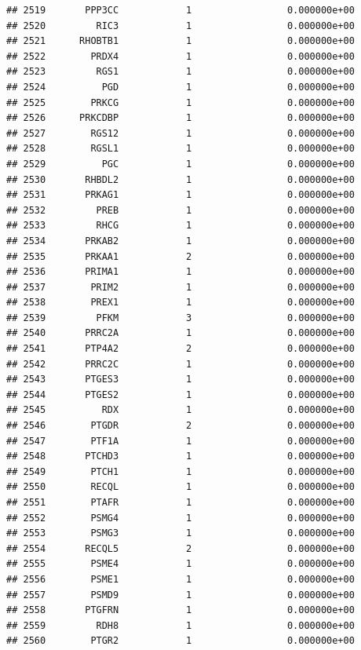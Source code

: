 \documentclass[
]{article}
\begin{document}
\begin{verbatim}
## 2519       PPP3CC            1                 0.000000e+00
## 2520         RIC3            1                 0.000000e+00
## 2521      RHOBTB1            1                 0.000000e+00
## 2522        PRDX4            1                 0.000000e+00
## 2523         RGS1            1                 0.000000e+00
## 2524          PGD            1                 0.000000e+00
## 2525        PRKCG            1                 0.000000e+00
## 2526      PRKCDBP            1                 0.000000e+00
## 2527        RGS12            1                 0.000000e+00
## 2528        RGSL1            1                 0.000000e+00
## 2529          PGC            1                 0.000000e+00
## 2530       RHBDL2            1                 0.000000e+00
## 2531       PRKAG1            1                 0.000000e+00
## 2532         PREB            1                 0.000000e+00
## 2533         RHCG            1                 0.000000e+00
## 2534       PRKAB2            1                 0.000000e+00
## 2535       PRKAA1            2                 0.000000e+00
## 2536       PRIMA1            1                 0.000000e+00
## 2537        PRIM2            1                 0.000000e+00
## 2538        PREX1            1                 0.000000e+00
## 2539         PFKM            3                 0.000000e+00
## 2540       PRRC2A            1                 0.000000e+00
## 2541       PTP4A2            2                 0.000000e+00
## 2542       PRRC2C            1                 0.000000e+00
## 2543       PTGES3            1                 0.000000e+00
## 2544       PTGES2            1                 0.000000e+00
## 2545          RDX            1                 0.000000e+00
## 2546        PTGDR            2                 0.000000e+00
## 2547        PTF1A            1                 0.000000e+00
## 2548       PTCHD3            1                 0.000000e+00
## 2549        PTCH1            1                 0.000000e+00
## 2550        RECQL            1                 0.000000e+00
## 2551        PTAFR            1                 0.000000e+00
## 2552        PSMG4            1                 0.000000e+00
## 2553        PSMG3            1                 0.000000e+00
## 2554       RECQL5            2                 0.000000e+00
## 2555        PSME4            1                 0.000000e+00
## 2556        PSME1            1                 0.000000e+00
## 2557        PSMD9            1                 0.000000e+00
## 2558       PTGFRN            1                 0.000000e+00
## 2559         RDH8            1                 0.000000e+00
## 2560        PTGR2            1                 0.000000e+00

\end{verbatim}
\end{document}
